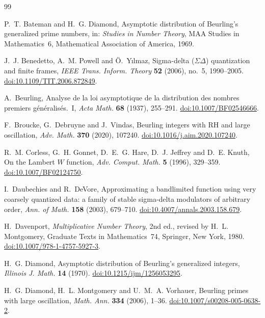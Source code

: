 \documentclass[11pt,reqno]{amsart}
\numberwithin{equation}{section}
\theoremstyle{plain}
\theoremstyle{definition}
\theoremstyle{remark}
\begin{document}
\begin{thebibliography}{99}

P.~T. Bateman and H.~G. Diamond, Asymptotic distribution of Beurling's generalized prime numbers, in: \emph{Studies in Number Theory}, MAA Studies in Mathematics~6, Mathematical Association of America, 1969.

J.~J. Benedetto, A.~M. Powell and \"O.~Y{\i}lmaz, Sigma-delta ($\Sigma\Delta$) quantization and finite frames, \emph{IEEE Trans. Inform. Theory} \textbf{52} (2006), no.~5, 1990--2005.
\href{https://doi.org/10.1109/TIT.2006.872849}{doi:10.1109/TIT.2006.872849}.

A.~Beurling, Analyse de la loi asymptotique de la distribution des nombres premiers g\'en\'eralis\'es.~I, \emph{Acta Math.} \textbf{68} (1937), 255--291.
\href{https://doi.org/10.1007/BF02546666}{doi:10.1007/BF02546666}.

F.~Broucke, G.~Debruyne and J.~Vindas, Beurling integers with RH and large oscillation, \emph{Adv. Math.} \textbf{370} (2020), 107240.
\href{https://doi.org/10.1016/j.aim.2020.107240}{doi:10.1016/j.aim.2020.107240}.

R.~M. Corless, G.~H. Gonnet, D.~E.~G. Hare, D.~J. Jeffrey and D.~E. Knuth, On the Lambert $W$ function, \emph{Adv. Comput. Math.} \textbf{5} (1996), 329--359.
\href{https://doi.org/10.1007/BF02124750}{doi:10.1007/BF02124750}.

I.~Daubechies and R.~DeVore, Approximating a bandlimited function using very coarsely quantized data: a family of stable sigma-delta modulators of arbitrary order, \emph{Ann. of Math.} \textbf{158} (2003), 679--710.
\href{https://doi.org/10.4007/annals.2003.158.679}{doi:10.4007/annals.2003.158.679}.

H.~Davenport, \emph{Multiplicative Number Theory}, 2nd ed., revised by H.~L. Montgomery, Graduate Texts in Mathematics~74, Springer, New York, 1980.
\href{https://doi.org/10.1007/978-1-4757-5927-3}{doi:10.1007/978-1-4757-5927-3}.

H.~G. Diamond, Asymptotic distribution of Beurling's generalized integers, \emph{Illinois J. Math.} \textbf{14} (1970).
\href{https://doi.org/10.1215/ijm/1256053295}{doi:10.1215/ijm/1256053295}.

H.~G. Diamond, H.~L. Montgomery and U.~M.~A. Vorhauer, Beurling primes with large oscillation, \emph{Math. Ann.} \textbf{334} (2006), 1--36.
\href{https://doi.org/10.1007/s00208-005-0638-2}{doi:10.1007/s00208-005-0638-2}.


\end{thebibliography}
\end{document}
